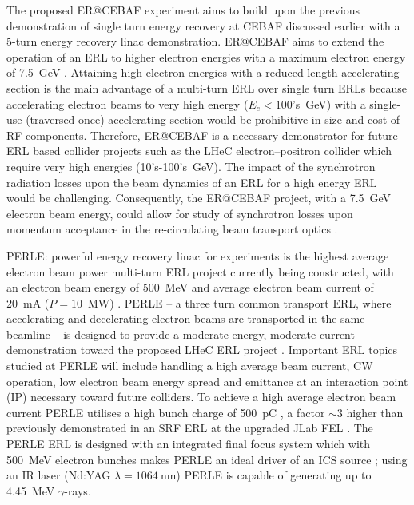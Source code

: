 \documentclass[../main.tex]{subfiles}
\begin{document}
The proposed ER@CEBAF experiment aims to build upon the previous demonstration of single turn energy recovery at CEBAF \cite{bogacz2003cebaf} discussed earlier with a 5-turn energy recovery linac demonstration. ER@CEBAF aims to extend the operation of an ERL to higher electron energies with a maximum electron energy of 7.5~\si{\giga\electronvolt} \cite{bogacz2016er,meot2016er}. Attaining high electron energies with a reduced length accelerating section is the main advantage of a multi-turn ERL over single turn ERLs because accelerating electron beams to very high energy ($E_{e} < 100$'s~\si{\giga\electronvolt}) with a single-use (traversed once) accelerating section would be prohibitive in size and cost of RF components. Therefore, ER@CEBAF is a necessary demonstrator for future ERL based collider projects such as the LHeC electron--positron collider \cite{valloni2013strawman,bruning2019exploring,holzer2021accelerator} which require very high energies (10's-100's~\si{\giga\electronvolt}). The impact of the synchrotron radiation losses upon the beam dynamics of an ERL for a high energy ERL would be challenging. Consequently, the ER@CEBAF project, with a 7.5~\si{\giga\electronvolt} electron beam energy, could allow for study of synchrotron losses upon momentum acceptance in the re-circulating beam transport optics \cite{adolphsen2022european}.  

PERLE: powerful energy recovery linac for experiments is the highest average electron beam power multi-turn ERL project currently being constructed, with an electron beam energy of 500~\si{\mega\electronvolt} and average electron beam current of 20~\si{\milli\ampere} ($P = 10$~\si{\mega\watt}) \cite{angal2018perle,bogacz2021perle}. PERLE -- a three turn common transport ERL, where accelerating and decelerating electron beams are transported in the same beamline -- is designed to provide a moderate energy, moderate current demonstration toward the proposed LHeC ERL project \cite{valloni2013strawman,bruning2019exploring,holzer2021accelerator}. Important ERL topics studied at PERLE will include handling a high average beam current, CW operation, low electron beam energy spread and emittance at an interaction point (IP) \cite{adolphsen2022european} necessary toward future colliders. To achieve a high average electron beam current PERLE utilises a high bunch charge of 500~\si{\pico\coulomb} \cite{hounsell2021optimization}, a factor $\sim3$ higher than previously demonstrated in an SRF ERL at the upgraded JLab FEL \cite{neil2006jlab}. The PERLE ERL is designed with an integrated final focus system which with 500~\si{\mega\electronvolt} electron bunches makes PERLE an ideal driver of an ICS source \cite{adolphsen2022european}; using an IR laser (Nd:YAG $\lambda=1064~\si{\nano\meter}$) PERLE is capable of generating up to 4.45~\si{\mega\electronvolt} $\gamma$-rays.      
\end{document}
